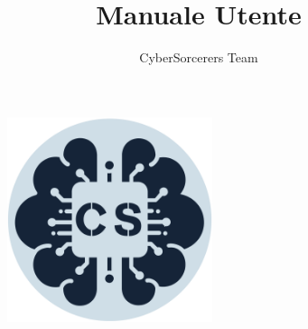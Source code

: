 \documentclass{article}
\title{\Huge{\textbf{Manuale Utente}}\vspace{-1em}}
\author{CyberSorcerers Team}
\date{}
\begin{document}
\maketitle
\vspace{-3em}
\begin{figure}[h]
  \centering
  \includegraphics[width=6cm, height=6cm]{documenti/logo rotondo.png}
  \label{fig:immagine}
\end{figure}
\end{document}
